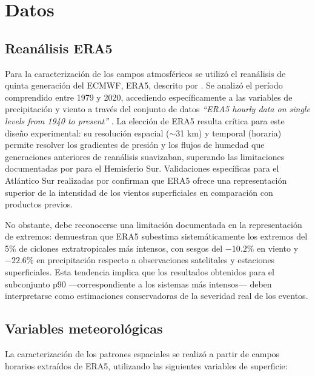 \section{Datos}\label{sec:datos}

\subsection{Reanálisis ERA5}\label{sec:datos_era5}

Para la caracterización de los campos atmosféricos se utilizó el reanálisis de quinta generación del ECMWF, ERA5, descrito por \citet{hersbach2020era5}. Se analizó el período comprendido entre 1979 y 2020, accediendo específicamente a las variables de precipitación y viento a través del conjunto de datos \textit{``ERA5 hourly data on single levels from 1940 to present''} \citep{hersbach_era5_2023b}. La elección de ERA5 resulta crítica para este diseño experimental: su resolución espacial ($\sim$31 km) y temporal (horaria) permite resolver los gradientes de presión y los flujos de humedad que generaciones anteriores de reanálisis suavizaban, superando las limitaciones documentadas por \citet{hodges2011comparison} para el Hemisferio Sur. Validaciones específicas para el Atlántico Sur realizadas por \citet{gramcianinov2020analysis} confirman que ERA5 ofrece una representación superior de la intensidad de los vientos superficiales en comparación con productos previos.

No obstante, debe reconocerse una limitación documentada en la representación de extremos: \citet{chen2024evaluation} demuestran que ERA5 subestima sistemáticamente los extremos del 5\% de ciclones extratropicales más intensos, con sesgos del $-10.2\%$ en viento y $-22.6\%$ en precipitación respecto a observaciones satelitales y estaciones superficiales. Esta tendencia implica que los resultados obtenidos para el subconjunto p90 —correspondiente a los sistemas más intensos— deben interpretarse como estimaciones conservadoras de la severidad real de los eventos.

\subsection{Variables meteorológicas}\label{subsec:variables}

La caracterización de los patrones espaciales se realizó a partir de campos horarios extraídos de ERA5, utilizando las siguientes variables de superficie:

